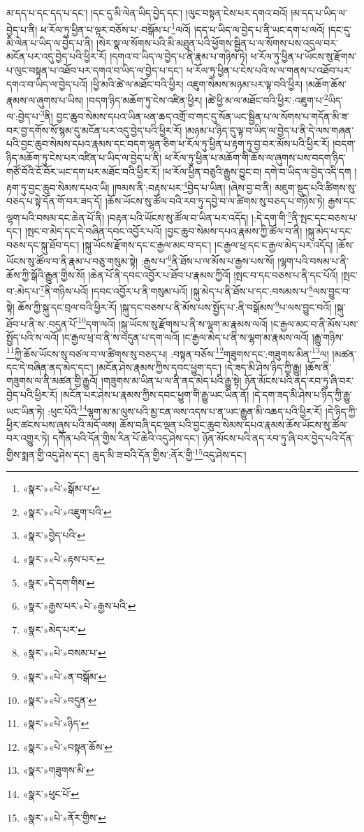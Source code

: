 མ་དད་པ་དང་དད་པ་དང་། །དང་དུ་མི་ལེན་ཡིད་བྱེད་དང་། །ལུང་བསྟན་ངེས་པར་དགའ་བའོ། །མ་དད་པ་ཡིད་ལ་བྱེད་པ་ནི། ཕ་རོལ་ཏུ་ཕྱིན་པ་ལྟར་བཅོས་པ་:བསྒོམ་པ་\footnote{«སྣར་»«པེ་»སྒོམ་པ་}ལའོ། །དད་པ་ཡིད་ལ་བྱེད་པ་ནི་ཡང་དག་པ་ལའོ། །དང་དུ་མི་ལེན་པ་ཡིད་ལ་བྱེད་པ་ནི། །སེར་སྣ་ལ་སོགས་པའི་མི་མཐུན་པའི་ཕྱོགས་སྦྱིན་པ་ལ་སོགས་པས་འདུལ་བར་མངོན་པར་འདུ་བྱེད་པའི་ཕྱིར་རོ། །དགའ་བ་ཡིད་ལ་བྱེད་པ་ནི་རྣམ་པ་གཉིས་ཏེ། ཕ་རོལ་ཏུ་ཕྱིན་པ་ཡོངས་སུ་རྫོགས་པ་ལུང་བསྟན་པ་འཐོབ་པར་དགའ་བ་ཡིད་ལ་བྱེད་པ་དང་། ཕ་རོལ་ཏུ་ཕྱིན་པ་ངེས་པའི་ས་ལ་གནས་པ་འཐོབ་པར་དགའ་བ་ཡིད་ལ་བྱེད་པའོ། །ཕྱི་མའི་ཚེ་ལ་མཐོང་བའི་ཕྱིར། འཇུག་སེམས་མཉམ་པར་ལྟ་བའི་ཕྱིར། །མཆོག་ཆོས་རྣམས་ལ་ཞུགས་པ་ཡིས། །བདག་ཉིད་མཆོག་ཏུ་ངེས་འཛིན་ཕྱིར། །ཚེ་ཕྱི་མ་ལ་མཐོང་བའི་ཕྱིར་:འཇུག་པ་\footnote{«སྣར་»«པེ་»འཇུག་པའི་}ཡིད་ལ་:བྱེད་པ་\footnote{«སྣར་»བྱེད་པའི་}ནི། བྱང་ཆུབ་སེམས་དཔའ་ཡིན་ཕན་ཆད་འགྲོ་བ་གང་དུ་སོན་ཡང་སྦྱིན་པ་ལ་སོགས་པ་གདོན་མི་ཟ་བར་བྱ་དགོས་སོ་སྙམ་དུ་མངོན་པར་འདུ་བྱེད་པའི་ཕྱིར་རོ། །མཉམ་པ་ཉིད་དུ་ལྟ་བ་ཡིད་ལ་བྱེད་པ་ནི་དེ་ལས་གཞན་པའི་བྱང་ཆུབ་སེམས་དཔའ་རྣམས་དང་བདག་ལྷན་ཅིག་ཕ་རོལ་ཏུ་ཕྱིན་པ་རྟག་ཏུ་བྱ་བར་མོས་པའི་ཕྱིར་རོ། །བདག་ཉིད་མཆོག་ཏུ་ངེས་པར་འཛིན་པ་ཡིད་ལ་བྱེད་པ་ནི། ཕ་རོལ་ཏུ་ཕྱིན་པ་མཆོག་གི་ཆོས་ལ་ཞུགས་པས་བདག་ཉིད་གཙོ་བོའི་ངོ་བོར་ཡང་དག་པར་མཐོང་བའི་ཕྱིར་རོ། །ཕ་རོལ་ཕྱིན་བཅུའི་རྒྱུས་བྱུང་བ། དགེ་བ་ཡིད་ལ་བྱེད་འདི་དག །རྟག་ཏུ་བྱང་ཆུབ་སེམས་དཔའ་ཡི། །ཁམས་ནི་:བརྟས་པར་\footnote{«སྣར་»«པེ་»རྟས་པར་}བྱེད་པ་ཡིན། །ཞེས་བྱ་བ་ནི། མཇུག་སྡུད་པའི་ཚིགས་སུ་བཅད་པ་སྟེ་དོན་གོ་བར་ཟད་དོ། །ཆོས་ཡོངས་སུ་ཚོལ་བའི་རབ་ཏུ་དབྱེ་བ་ལ་ཚིགས་སུ་བཅད་པ་གཉིས་ཏེ། རྒྱས་དང་ལྷག་པའི་བསམ་དང་ཆེན་པོ་ནི། །བརྟན་པའི་ཡོངས་སུ་ཚོལ་བ་ཡིན་པར་འདོད། །:དེ་དག་གི་\footnote{«སྣར་»དེ་དག་གིས་}ནི་སྤང་དང་བཅས་པ་དང་། །སྤང་བ་མེད་དང་དེ་བཞིན་དབང་འབྱོར་པའོ། །བྱང་ཆུབ་སེམས་དཔའ་རྣམས་ཀྱི་ཚོལ་བ་ནི། །སྐུ་མེད་པ་དང་བཅས་དང་སྐུ་ཐོབ་དང་། །སྐུ་ཡོངས་རྫོགས་དང་ང་རྒྱལ་མང་བ་དང་། །ང་རྒྱལ་ཕྲ་དང་ང་རྒྱལ་མེད་པར་འདོད། །ཆོས་ཡོངས་སུ་ཚོལ་བ་ནི་རྣམ་པ་བཅུ་གསུམ་སྟེ། :རྒྱས་པ་\footnote{«སྣར་»རྒྱས་པར་«པེ་»རྒྱས་པའི་}ནི་ཐོས་པ་ལ་མོས་པ་རྒྱས་པས་སོ། །ལྷག་པའི་བསམ་པ་ནི་ཆོས་ཀྱི་སྒོའི་རྒྱུན་གྱིས་སོ། །ཆེན་པོ་ནི་དབང་འབྱོར་པ་ཐོབ་པ་རྣམས་ཀྱིའོ། །སྤང་བ་དང་བཅས་པ་ནི་དང་པོའོ། །སྤང་བ་:མེད་པ་\footnote{«སྣར་»མེད་པར་}ནི་གཉིས་པའོ། །དབང་འབྱོར་པ་ནི་གསུམ་པའོ། །སྐུ་མེད་པ་ནི་ཐོས་པ་དང་:བསམས་པ་\footnote{«སྣར་»«པེ་»བསམ་པ་}ལས་བྱུང་བ་སྟེ། ཆོས་ཀྱི་སྐུ་དང་བྲལ་བའི་ཕྱིར་རོ། །སྐུ་དང་བཅས་པ་ནི་མོས་པས་སྤྱོད་པ་:ནི་བསྒོམས་\footnote{«སྣར་»«པེ་»ན་བསྒོམ་}པ་ལས་བྱུང་བའོ། །སྐུ་ཐོབ་པ་ནི་ས་:བདུན་པོ་\footnote{«སྣར་»«པེ་»བདུན་}དག་ལའོ། །སྐུ་ཡོངས་སུ་རྫོགས་པ་ནི་ས་ལྷག་མ་རྣམས་ལའོ། །ང་རྒྱལ་མང་བ་ནི་མོས་པས་སྤྱོད་པའི་ས་ལའོ། །ང་རྒྱལ་ཕྲ་བ་ནི་ས་བདུན་པ་དག་ལའོ། །ང་རྒྱལ་མེད་པ་ནི་ས་ལྷག་མ་རྣམས་ལའོ། །རྒྱུ་གཉིས་\footnote{«སྣར་»«པེ་»ཉིད་}ཀྱི་ཆོས་ཡོངས་སུ་བཙལ་བ་ལ་ཚིགས་སུ་བཅད་པ། :བསྟན་བཅོས་\footnote{«སྣར་»«པེ་»བསྟན་ཆོས་}གཟུགས་དང་:གཟུགས་མིན་\footnote{«སྣར་»གཟུགས་མི་}ལ། །མཚན་དང་དེ་བཞིན་ནད་མེད་དང་། །མངོན་ཤེས་རྣམས་ཀྱིས་དབང་ཕྱུག་དང་། །དེ་ཟད་མི་ཤེས་ཉིད་ཀྱི་རྒྱུ། །ཆོས་ནི་གཟུགས་ལ་ནི་མཚན་གྱི་རྒྱུའོ། །གཟུགས་མ་ཡིན་པ་ལ་ནི་ནད་མེད་པའི་རྒྱུ་སྟེ། ཉོན་མོངས་པའི་ནད་རབ་ཏུ་ཞི་བར་བྱེད་པའི་ཕྱིར་རོ། །མངོན་པར་ཤེས་པ་རྣམས་ཀྱིས་དབང་ཕྱུག་གི་རྒྱུ་ཡང་ཡིན་ནོ། །དེ་དག་ཟད་མི་ཤེས་པ་ཉིད་ཀྱི་རྒྱུ་ཡང་ཡིན་ཏེ། :ཕུང་པོའི་\footnote{«སྣར་»ཕུང་པོ་}ལྷག་མ་མ་ལུས་པའི་མྱ་ངན་ལས་འདས་པ་ན་ཡང་རྒྱུན་མི་འཆད་པའི་ཕྱིར་རོ། །དེ་ཉིད་ཀྱི་ཕྱིར་ཚངས་པས་ཞུས་པའི་མདོ་ལས། ཆོས་བཞི་དང་ལྡན་པའི་བྱང་ཆུབ་སེམས་དཔའ་རྣམས་ཆོས་ཡོངས་སུ་ཚོལ་བར་འགྱུར་ཏེ། དཀོན་པའི་དོན་གྱིས་རིན་པོ་ཆེའི་འདུ་ཤེས་དང་། ཉོན་མོངས་པའི་ནད་རབ་ཏུ་ཞི་བར་བྱེད་པའི་དོན་གྱིས་སྨན་གྱི་འདུ་ཤེས་དང་། ཆུད་མི་ཟ་བའི་དོན་གྱིས་:ནོར་གྱི་\footnote{«སྣར་»«པེ་»ནོར་གྱིས་}འདུ་ཤེས་དང་། 